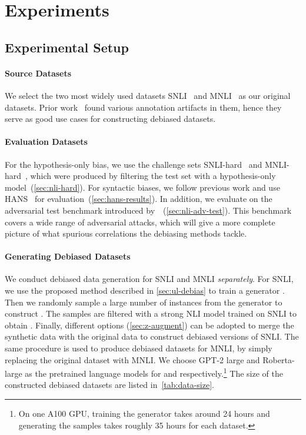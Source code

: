 \section{Experiments} \label{sec:exp}
\subsection{Experimental Setup}


\paragraph{Source Datasets}

We select the two most widely used \ourtask{} datasets SNLI~\citep{snli} and MNLI~\citep{mnli} as our original datasets.
Prior work~\citep{GururanganSLSBS18,PoliakNHRD18,hans} found various annotation artifacts in them, hence they serve as good use cases for constructing debiased datasets.

\paragraph{Evaluation Datasets}
For the hypothesis-only bias, we use the challenge sets SNLI-hard~\citep{GururanganSLSBS18} and MNLI-hard~\citep{mnli}, which were produced by filtering the test set with a hypothesis-only model~(\cref{sec:nli-hard}).
For syntactic biases, we follow previous work and use HANS~\citep{hans} for evaluation~(\cref{sec:hans-results}).
In addition, we evaluate on the adversarial test benchmark introduced by~\citet{model-agnostic-debias}~(\cref{sec:nli-adv-test}).
This benchmark covers a wide range of adversarial attacks, which will give a more complete picture of what spurious correlations the debiasing methods tackle. 



\paragraph{Generating Debiased Datasets}
We conduct debiased data generation for SNLI and MNLI \emph{separately}.
For SNLI, we use the proposed method described in \cref{sec:ul-debias} to train a generator .
Then we randomly sample a large number of instances from the generator to construct .
The samples are filtered with a strong NLI model  trained on SNLI to obtain  .
Finally, different options (\cref{sec:z-augment}) can be adopted to merge the synthetic data with the original data   to construct debiased versions of SNLI.
The same procedure is used to produce debiased datasets for MNLI, by simply replacing the original dataset with MNLI.
We choose GPT-2 large and Roberta-large as the pretrained language models for  and  respectively.\footnote{On one A100 GPU, training the generator takes around 24 hours and generating the samples takes roughly 35 hours for each dataset.}
The size of the constructed debiased datasets are listed in~\cref{tab:data-size}.


